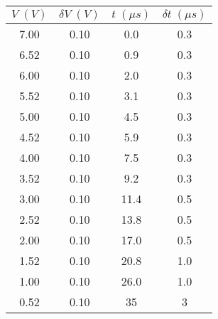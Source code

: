 \begin{tabular}{cc|cc}
\toprule
$V \; (V)$ & $\delta V \; (V)$ & $t \; (\mu s)$ & $\delta t \; (\mu s)$ \\
\midrule
      7.00 &               0.10 &            0.0 &                  0.3 \\
      6.52 &               0.10 &            0.9 &                  0.3 \\
      6.00 &               0.10 &            2.0 &                  0.3 \\
      5.52 &               0.10 &            3.1 &                  0.3 \\
      5.00 &               0.10 &            4.5 &                  0.3 \\
      4.52 &               0.10 &            5.9 &                  0.3 \\
      4.00 &               0.10 &            7.5 &                  0.3 \\
      3.52 &               0.10 &            9.2 &                  0.3 \\
      3.00 &               0.10 &           11.4 &                  0.5 \\
      2.52 &               0.10 &           13.8 &                  0.5 \\
      2.00 &               0.10 &           17.0 &                  0.5 \\
      1.52 &               0.10 &           20.8 &                  1.0 \\
      1.00 &               0.10 &           26.0 &                  1.0 \\
      0.52 &               0.10 &           35 &                  3 \\
\bottomrule
\end{tabular}

